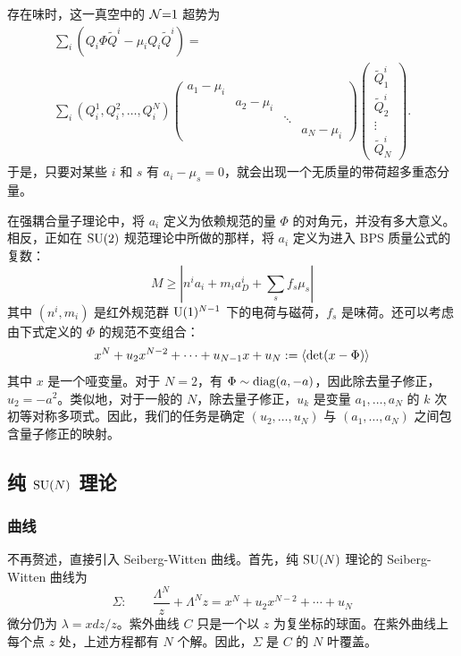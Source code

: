 存在味时，这一真空中的 $\mathcal{N}{=}1$ 超势为
\begin{multline}
\sum_i(Q_i\Phi\tilde Q^i-\mu_iQ_i\tilde Q^i)
=\\
\sum_i(Q_i^1,Q_i^2,\ldots,Q_i^N)
\begin{pmatrix}
a_1-\mu_i\\
&a_2-\mu_i\\
&&\ddots\\
&&&a_N-\mu_i
\end{pmatrix}
\begin{pmatrix}
\tilde Q^i_1\\
\tilde Q^i_2\\
\vdots\\
\tilde Q^i_N
\end{pmatrix}.
\end{multline}
于是，只要对某些 $i$ 和 $s$ 有 $a_i-\mu_s=0$，就会出现一个无质量的带荷超多重态分量。

在强耦合量子理论中，将 $a_i$ 定义为依赖规范的量 $\Phi$ 的对角元，并没有多大意义。相反，正如在 $\mathop{\mathrm{SU}}(2)$ 规范理论中所做的那样，将 $a_i$ 定义为进入 BPS 质量公式的复数：
\begin{equation}
M\ge|n^ia_i+m_ia_D^i+\sum_sf_s\mu_s|
\end{equation}
其中 $(n^i,m_i)$ 是红外规范群 ${\mathrm{U}}(1)^{N-1}$ 下的电荷与磁荷，$f_s$ 是味荷。还可以考虑由下式定义的 $\Phi$ 的规范不变组合：
\begin{equation}
x^N+u_2x^{N-2}+\cdots+u_{N-1}x+u_N:=\langle\det(x-\Phi)\rangle
\end{equation}
其中 $x$ 是一个哑变量。对于 $N=2$，有 $\Phi\sim\mathop{\mathrm{diag}}(a,-a)$，因此除去量子修正，$u_2=-a^2$。类似地，对于一般的 $N$，除去量子修正，$u_k$ 是变量 $a_1,\ldots,a_N$ 的 $k$ 次初等对称多项式。因此，我们的任务是确定 $(u_2,\ldots,u_N)$ 与 $(a_1,\ldots,a_N)$ 之间包含量子修正的映射。

\subsection{纯 $\mathop{\mathrm{SU}}(N)$ 理论}\label{sec:pureSUN}
\subsubsection{曲线}
不再赘述，直接引入 Seiberg-Witten 曲线。首先，纯 $\mathop{\mathrm{SU}}(N)$ 理论的 Seiberg-Witten 曲线为
\begin{equation}
\Sigma:\qquad\frac{\Lambda^N}z+\Lambda^Nz=x^N+u_2x^{N-2}+\cdots+u_N\label{puresuNcurve}
\end{equation}
微分仍为 $\lambda=xdz/z$。紫外曲线 $C$ 只是一个以 $z$ 为复坐标的球面。在紫外曲线上每个点 $z$ 处，上述方程都有 $N$ 个解。因此，$\Sigma$ 是 $C$ 的 $N$ 叶覆盖。

